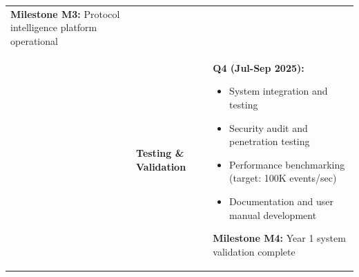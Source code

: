 \documentclass[12pt,a4paper]{article}
\begin{document}
\begin{longtable}{|p{2cm}|p{4cm}|p{8.5cm}|}
\textbf{Milestone M3:} Protocol intelligence platform operational \\
\cline{2-3}

& \textbf{Testing \& Validation} & 
\textbf{Q4 (Jul-Sep 2025):}
\begin{itemize}[leftmargin=1em, itemsep=0pt]
    \item System integration and testing
    \item Security audit and penetration testing
    \item Performance benchmarking (target: 100K events/sec)
    \item Documentation and user manual development
\end{itemize}

\textbf{Milestone M4:} Year 1 system validation complete \\
\hline

\end{longtable}

\newpage
\end{document}
